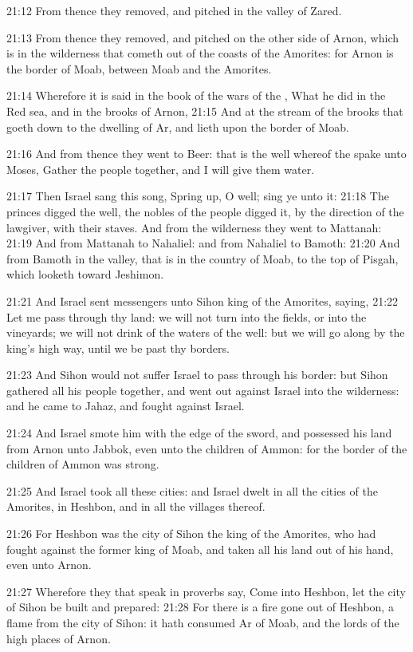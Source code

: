 21:12 From thence they removed, and pitched in the valley of Zared.

21:13 From thence they removed, and pitched on the other side of Arnon, which is in the wilderness that cometh out of the coasts of the Amorites: for Arnon is the border of Moab, between Moab and the Amorites.

21:14 Wherefore it is said in the book of the wars of the \LORD, What he did in the Red sea, and in the brooks of Arnon, 21:15 And at the stream of the brooks that goeth down to the dwelling of Ar, and lieth upon the border of Moab.

21:16 And from thence they went to Beer: that is the well whereof the \LORD spake unto Moses, Gather the people together, and I will give them water.

21:17 Then Israel sang this song, Spring up, O well; sing ye unto it: 21:18 The princes digged the well, the nobles of the people digged it, by the direction of the lawgiver, with their staves. And from the wilderness they went to Mattanah: 21:19 And from Mattanah to Nahaliel: and from Nahaliel to Bamoth: 21:20 And from Bamoth in the valley, that is in the country of Moab, to the top of Pisgah, which looketh toward Jeshimon.

21:21 And Israel sent messengers unto Sihon king of the Amorites, saying, 21:22 Let me pass through thy land: we will not turn into the fields, or into the vineyards; we will not drink of the waters of the well: but we will go along by the king's high way, until we be past thy borders.

21:23 And Sihon would not suffer Israel to pass through his border: but Sihon gathered all his people together, and went out against Israel into the wilderness: and he came to Jahaz, and fought against Israel.

21:24 And Israel smote him with the edge of the sword, and possessed his land from Arnon unto Jabbok, even unto the children of Ammon: for the border of the children of Ammon was strong.

21:25 And Israel took all these cities: and Israel dwelt in all the cities of the Amorites, in Heshbon, and in all the villages thereof.

21:26 For Heshbon was the city of Sihon the king of the Amorites, who had fought against the former king of Moab, and taken all his land out of his hand, even unto Arnon.

21:27 Wherefore they that speak in proverbs say, Come into Heshbon, let the city of Sihon be built and prepared: 21:28 For there is a fire gone out of Heshbon, a flame from the city of Sihon: it hath consumed Ar of Moab, and the lords of the high places of Arnon.

